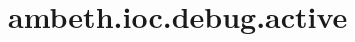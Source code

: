 \section{ambeth.ioc.debug.active}
\label{configuration:AmbethIocDebugActive}
\AvailableInJavaAndCsharp{\TODO}